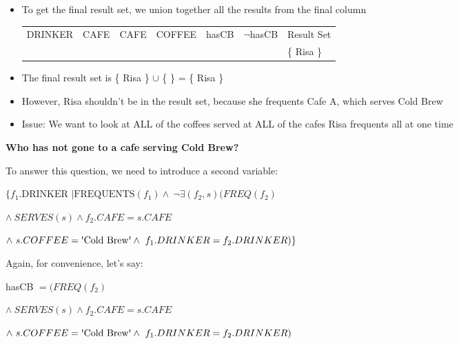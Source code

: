\documentclass{article}
\begin{document}
\begin{itemize}
\item To get the final result set, we union together all the results from the final column

\hspace{-1em}
\begin{tabular}{|l|l|l|p{2cm}||l|l||l|}  \hline \hline
\color{white}\textrm{DRINKER} & \color{white}\textrm{CAFE} & \color{white} \textrm{CAFE} &  \color{white}\textrm{COFFEE} &\color{white}\textrm{hasCB} & \color{white} $\neg$\textrm{hasCB} &\color{white} \textrm{Result Set}\\ 

& & & & & & \{ Risa \} \\ \hline
 \end{tabular}

\item The final result set is \{ Risa \} $\cup$ \{ \}  = \{ Risa \}
\item However, Risa shouldn't be in the result set, because she frequents Cafe A, which serves Cold Brew 
\item Issue: We want to look at ALL of the coffees served at ALL of the cafes Risa frequents all at one time
\end{itemize}

\newpage

\textbf{Who has not gone to a cafe serving Cold Brew?}

To answer this question, we need to introduce a second variable:

$\{f_1.\textrm{DRINKER } | \textrm{FREQUENTS}(f_1) \wedge\ \neg \exists(f_2,s)(FREQ(f_2) $

\hspace{2em} $\wedge\ SERVES(s) \wedge f_2.CAFE = s.CAFE $

\hspace{2em} $\wedge\ s.COFFEE =  \textrm{\textquotesingle{Cold Brew}\textquotesingle} \wedge\ f_1.DRINKER = f_2.DRINKER) \}$


Again, for convenience, let's say:
 
hasCB $ =(FREQ(f_2) $

\hspace{2em} $\wedge\ SERVES(s) \wedge f_2.CAFE = s.CAFE $

\hspace{2em} $\wedge\ s.COFFEE =  \textrm{\textquotesingle{Cold Brew}\textquotesingle} \wedge\ f_1.DRINKER = f_2.DRINKER) $
\end{document}
